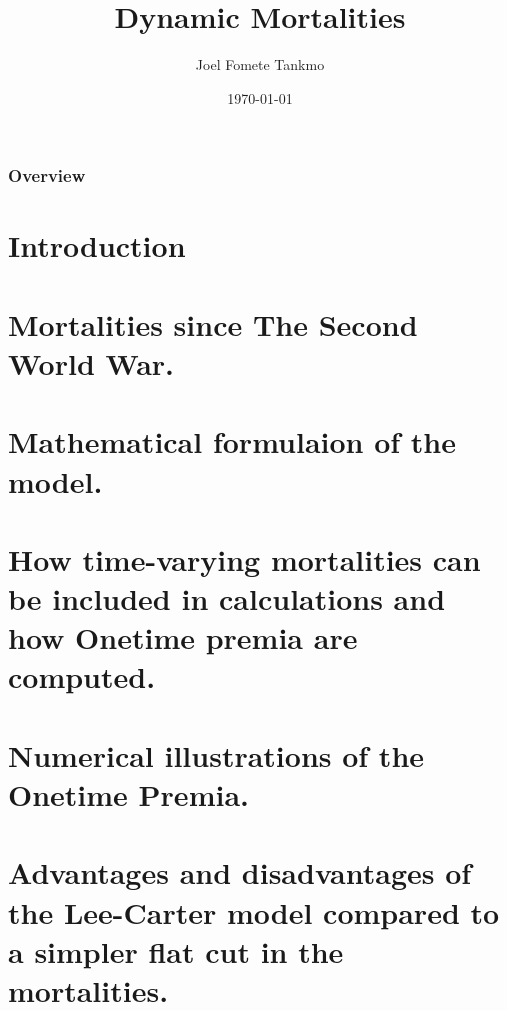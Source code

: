 \documentclass{beamer}
\title[Mortalities and
 Economic Impact.]{ Dynamic Mortalities} %
\author{Joel Fomete Tankmo} %
\institute[UiO] %
{
University of Oslo \\ %
\medskip
\textit{joelfomet@yahoo.fr} %
}
\date{\today} %
\begin{document}
\begin{frame}
\titlepage %
\end{frame}

\begin{frame}
\frametitle{Overview} %
\tableofcontents %


\section{Introduction} %
\section{ Mortalities since The Second World War.} 

\section{Mathematical formulaion of the model.}

\section{ How time-varying mortalities can be included in calculations and how Onetime premia are computed.}

\section{Numerical illustrations of the Onetime Premia.}

\section{Advantages and disadvantages of the Lee-Carter model compared to a simpler flat cut in the mortalities.}

\end{frame}
\end{document}
